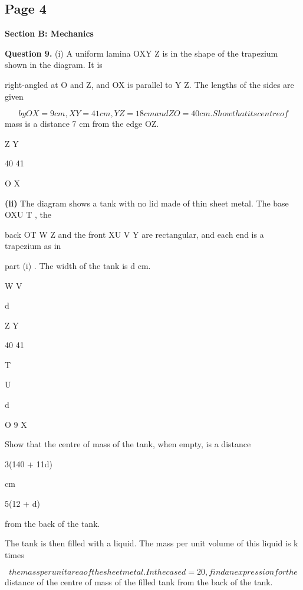 \documentclass[12pt]{article}
\begin{document}
\subsection*{Page 4}
\begin{flushleft}
\bigskip\textbf{Section B: Mechanics}\par
\bigskip\textbf{Question 9.} (i) A uniform lamina OXY Z is in the shape of the trapezium shown in the diagram. It is\par
right-angled at O and Z, and OX is parallel to Y Z. The lengths of the sides are given\par
\[by OX = 9 cm, XY = 41 cm, Y Z = 18 cm and ZO = 40 cm. Show that its centre of\]
mass is a distance 7 cm from the edge OZ.\par
Z Y\par
40 41\par
O X\par
\textbf{(ii)} The diagram shows a tank with no lid made of thin sheet metal. The base OXU T , the\par
back OT W Z and the front XU V Y are rectangular, and each end is a trapezium as in\par
part (i) . The width of the tank is d cm.\par
W V\par
d\par
Z Y\par
40 41\par
T\par
U\par
d\par
O 9 X\par
Show that the centre of mass of the tank, when empty, is a distance\par
3(140 + 11d)\par
cm\par
5(12 + d)\par
from the back of the tank.\par
The tank is then filled with a liquid. The mass per unit volume of this liquid is k times\par
\[the mass per unit area of the sheet metal. In the case d = 20, find an expression for the\]
distance of the centre of mass of the filled tank from the back of the tank.\par
\end{flushleft}
\end{document}
